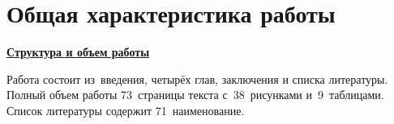 \section*{Общая характеристика работы}

\newcommand{\actuality}{\pdfbookmark[1]{Актуальность}{actuality}\underline{\textbf{\actualityTXT}}}
\newcommand{\progress}{\pdfbookmark[1]{Разработанность темы}{progress}\underline{\textbf{\progressTXT}}}
\newcommand{\aim}{\pdfbookmark[1]{Цели}{aim}\underline{{\textbf\aimTXT}}}
\newcommand{\tasks}{\pdfbookmark[1]{Задачи}{tasks}\underline{\textbf{\tasksTXT}}}
\newcommand{\aimtasks}{\pdfbookmark[1]{Цели и задачи}{aimtasks}\aimtasksTXT}
\newcommand{\novelty}{\pdfbookmark[1]{Научная новизна}{novelty}\underline{\textbf{\noveltyTXT}}}
\newcommand{\influence}{\pdfbookmark[1]{Практическая значимость}{influence}\underline{\textbf{\influenceTXT}}}
\newcommand{\methods}{\pdfbookmark[1]{Методология и методы исследования}{methods}\underline{\textbf{\methodsTXT}}}
\newcommand{\defpositions}{\pdfbookmark[1]{Основные положения, выносимые на защиту}{defpositions}\underline{\textbf{\defpositionsTXT}}}
\newcommand{\reliability}{\pdfbookmark[1]{Достоверность}{reliability}\underline{\textbf{\reliabilityTXT}}}
\newcommand{\probation}{\pdfbookmark[1]{Апробация}{probation}\underline{\textbf{\probationTXT}}}
\newcommand{\contribution}{\pdfbookmark[1]{Личный вклад}{contribution}\underline{\textbf{\contributionTXT}}}
\newcommand{\publications}{\pdfbookmark[1]{Публикации}{publications}\underline{\textbf{\publicationsTXT}}}
\newcommand{\structureandsize}{\pdfbookmark[1]{Структура и объем работы}{structureandsize}\underline{\textbf{\structureandsizeTXT}}}



\underline{\textbf{Структура и объем работы}} 

Работа состоит из~введения,
четырёх глав, заключения и списка литературы. Полный объем работы
73~страницы текста с~38~рисунками и~9~таблицами. Список
литературы содержит 71~наименование.


